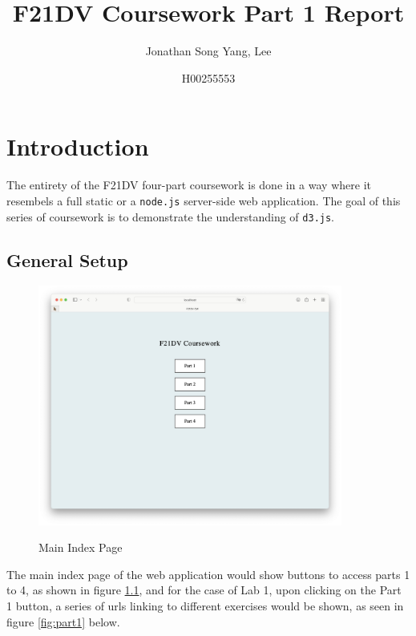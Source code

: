 \documentclass{scrreprt}
\title{F21DV Coursework Part 1 Report}
\author{Jonathan Song Yang, Lee}
\date{H00255553}
\begin{document}
\maketitle

\newpage
\tableofcontents


\newpage
\chapter{Introduction}
The entirety of the F21DV four-part coursework is done in a way where it resembels
a full static or a \verb|node.js| server-side web application. The goal of this
series of coursework is to demonstrate the understanding of \verb|d3.js|.

\section{General Setup}
\begin{figure}[!ht]
    \centering
    \includegraphics[width = 10cm]{images/main.png}
    \label{fig:main}
    \caption{Main Index Page}
\end{figure}
\FloatBarrier
The main index page of the web application would show buttons to access parts 1 to
4, as shown in figure \ref{fig:main}, and for the case of Lab 1, upon clicking on
the Part 1 button, a series of urls linking to different exercises would be shown,
as seen in figure \ref{fig:part1} below.
\end{document}
